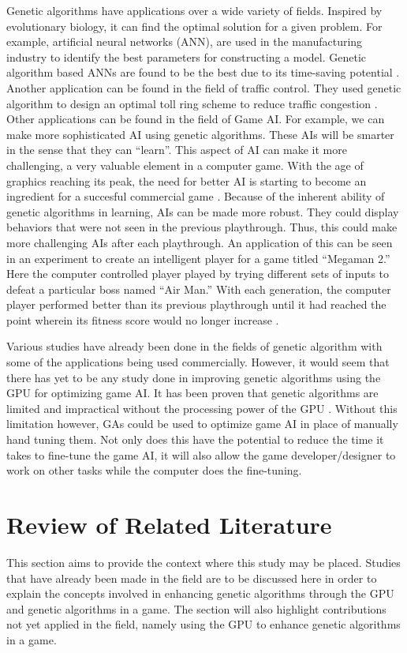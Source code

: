 \documentclass{acm_proc_article-sp}
\begin{document}
Genetic algorithms have applications over a wide variety of fields.
Inspired by evolutionary biology, it can find the optimal solution
for a given problem. For example, artificial neural networks (ANN),
are used in the manufacturing industry to identify the best parameters
for constructing a model. Genetic algorithm based ANNs are found to be
the best due to its time-saving potential \cite{Venkatesan08}. Another
application can be found in the field of traffic control. They used
genetic algorithm to design an optimal toll ring scheme to reduce traffic
congestion \cite{Sumalee08}. Other applications can be found in the field
of Game AI. For example, we can make more sophisticated AI using genetic
algorithms. These AIs will be smarter in the sense that they can ``learn''.
This aspect of AI can make it more challenging, a very valuable element
in a computer game. With the age of graphics reaching its peak, the need
for better AI is starting to become an ingredient for a succesful
commercial game \cite{Yue06}. Because of the inherent ability of genetic
algorithms in learning, AIs can be made more robust. They could display
behaviors that were not seen in the previous playthrough. Thus, this
could make more challenging AIs after each playthrough. An application
of this can be seen in an experiment to create an intelligent player
for a game titled ``Megaman 2.'' Here the
computer controlled player played by trying different sets of inputs
to defeat a particular boss named ``Air Man.'' With each generation,
the computer player performed better than its previous playthrough
until it had reached the point wherein its fitness score would no longer
increase \cite{website:Kuliniewicz09}.


Various studies have already been done in the fields of genetic algorithm with
some of the applications being used commercially. However, it would seem that there
has yet to be any study done in improving genetic algorithms using the GPU for optimizing
game AI. It has been proven that genetic algorithms are limited and impractical without
the processing power of the GPU \cite{Banzhaf09}. Without this limitation however, GAs
could be used to optimize game AI in place of manually hand tuning them. Not only does
this have the potential to reduce the time it takes to fine-tune the game AI, it will
also allow the game developer/designer to work on other tasks while the computer
does the fine-tuning.

\section{Review of Related Literature}
This section aims to provide the context where this study may be placed. 
Studies that have already been made in the field are to be discussed here in order to 
explain the concepts involved in enhancing genetic algorithms through the GPU and 
genetic algorithms in a game. The section will also highlight contributions not yet 
applied in the field, namely using the GPU to enhance genetic algorithms in a game.
\end{document}

